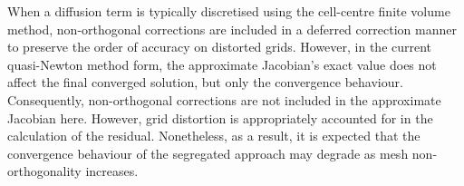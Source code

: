 \documentclass[sn-mathphys,Numbered]{sn-jnl}%
\begin{document}
When a diffusion term is typically discretised using the cell-centre finite volume method, non-orthogonal corrections are included in a deferred correction manner to preserve the order of accuracy on distorted grids.
However, in the current quasi-Newton method form, the approximate Jacobian's exact value does not affect the final converged solution, but only the convergence behaviour.
Consequently, non-orthogonal corrections are not included in the approximate Jacobian here. However, grid distortion is appropriately accounted for in the calculation of the residual.
Nonetheless, as a result, it is expected that the convergence behaviour of the segregated approach may degrade as mesh non-orthogonality increases.
\end{document}

